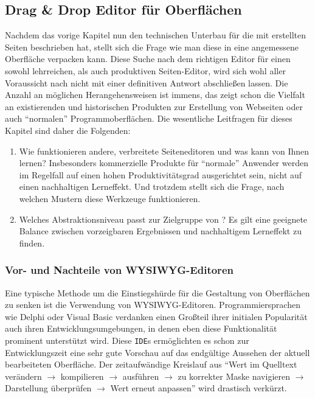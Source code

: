 \subsection{Drag \& Drop Editor für Oberflächen}
\label{sec:drag-drop-ui-editor}

Nachdem das vorige Kapitel nun den technischen Unterbau für die mit \idename{} erstellten Seiten beschrieben hat, stellt sich die Frage wie man diese in eine angemessene Oberfläche verpacken kann. Diese Suche nach dem richtigen Editor für einen sowohl lehrreichen, als auch produktiven Seiten-Editor, wird sich wohl aller Voraussicht nach nicht mit einer definitiven Antwort abschließen lassen. Die Anzahl an möglichen Herangehensweisen ist immens, das zeigt schon die Vielfalt an existierenden und historischen Produkten zur Erstellung von Webseiten oder auch "`normalen"' Programmoberflächen. Die wesentliche Leitfragen für dieses Kapitel sind daher die Folgenden:

\begin{enumerate}[noitemsep]
\item Wie funktionieren andere, verbreitete Seiteneditoren und was kann \idename{} von Ihnen lernen? Insbesonders kommerzielle Produkte für "`normale"' Anwender werden im Regelfall auf einen hohen Produktivitätsgrad ausgerichtet sein, nicht auf einen nachhaltigen Lerneffekt. Und trotzdem stellt sich die Frage, nach welchen Mustern diese Werkzeuge funktionieren.
\item Welches Abstraktionsniveau passt zur Zielgruppe von \idename{}? Es gilt eine geeignete Balance zwischen vorzeigbaren Ergebnissen und nachhaltigem Lerneffekt zu finden.
\end{enumerate}

\subsubsection{Vor- und Nachteile von WYSIWYG-Editoren}
\label{sec:pro-con-wysiwyg-editor}

Eine typische Methode um die Einstiegshürde für die Gestaltung von Oberflächen zu senken ist die Verwendung von WYSIWYG-Editoren. Programmiersprachen wie Delphi oder Visual Basic verdanken einen Großteil ihrer initialen Popularität auch ihren Entwicklungsumgebungen, in denen eben diese Funktionalität prominent unterstützt wird. Diese \texttt{IDE}s ermöglichten es schon zur Entwicklungszeit eine sehr gute Vorschau auf das endgültige Aussehen der aktuell bearbeiteten Oberfläche. Der zeitaufwändige Kreislauf aus "`Wert im Quelltext verändern $\rightarrow$  kompilieren $\rightarrow$ ausführen $\rightarrow$ zu korrekter Maske navigieren $\rightarrow$ Darstellung überprüfen $\rightarrow$ Wert erneut anpassen"' wird drastisch verkürzt.

